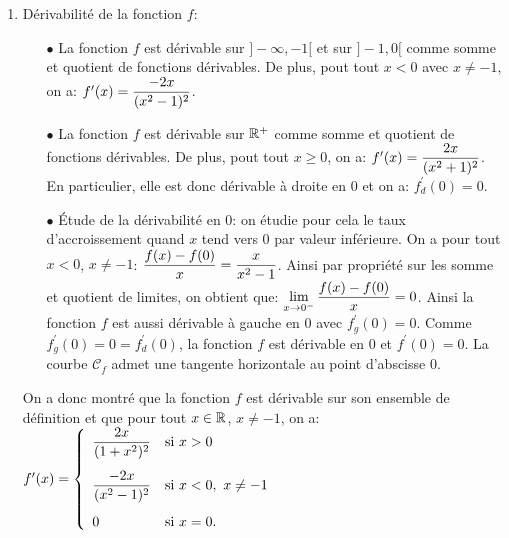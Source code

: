 \documentclass[a4paper, 11pt,reqno]{article}
\begin{document}
\begin{correction}
\begin{enumerate}
\begin{itemize}
			      \item[$\bullet$] La fonction $f$ est continue sur $\R^+$ comme somme et quotient de fonctions continues. En particulier, on a que: $f(0)=0=\lim\limits_{x\to 0^+} f(x)$.
			      \item[$\bullet$] \'Etude de la continuit\'e en 0: comme la fonction $f$ est d\'efinie par un raccord en 0, on doit \'etudier la continuit\'e de $f$ en 0 par les limites. On a d\'ej\`{a} que la fonction $f$ est continue \`{a} droite en 0 avec $f(0)=0=\lim\limits_{x\to 0^+} f(x)$. \'Etude de la limite \`{a} gauche en 0: on a: $\lim\limits_{x\to 0^-} f(x)=\lim\limits_{x\to 0^-} \ddp\frac{x^2}{x^2-1}=0$ par propri\'et\'es sur les somme et quotient de limites. Ainsi, on a: $f(0)=0=\lim\limits_{x\to 0^+} f(x)=\lim\limits_{x\to 0^-} f(x)$ et donc $f$ est continue en 0.
		      \end{itemize}
		      Ainsi la fonction $f$ est continue sur son ensemble de d\'efinition.
		\item D\'erivabilit\'e de la fonction $f$:
		      \begin{itemize}
			      \item[$\bullet$] La fonction $f$ est d\'erivable sur $\rbrack -\infty,-1\lbrack$ et sur $\rbrack -1,0\lbrack$ comme somme et quotient de fonctions d\'erivables. De plus, pout tout $x<0$ avec $x\not= -1$, on a: $f^{\prime}(x)=\displaystyle\frac{-2x}{(x^2-1)^2}$.
			      \item[$\bullet$] La fonction $f$ est d\'erivable sur $\R^+$ comme somme et quotient de fonctions d\'erivables. De plus, pout tout $x\geq 0$, on a: $f^{\prime}(x)=\displaystyle\frac{2x}{(x^2+1)^2}$. En particulier, elle est donc d\'erivable \`{a} droite en 0 et on a: $f_d^{\prime}(0)=0$.
			      \item[$\bullet$] \'Etude de la d\'erivabilit\'e en 0: on \'etudie pour cela le taux d'accroissement quand $x$ tend vers $0$ par valeur inf\'erieure. On a pour tout $x<0$, $x\not= -1$: $\displaystyle\frac{f(x)-f(0)}{x}=\displaystyle\frac{x}{x^2-1}$. Ainsi par propri\'et\'e sur les somme et quotient de limites, on obtient que: $\lim\limits_{x\to 0^-} \displaystyle\frac{f(x)-f(0)}{x}=0$. Ainsi la fonction $f$ est aussi d\'erivable \`{a} gauche en 0 avec $f_g^{\prime}(0)=0$. Comme $f_g^{\prime}(0)=0=f_d^{\prime}(0)$, la fonction $f$ est d\'erivable en 0 et $f^{\prime}(0)=0$. La courbe $\mathcal{C}_f$ admet une tangente horizontale au point d'abscisse 0.
		      \end{itemize}
		      On a donc montr\'e que la fonction $f$ est d\'erivable sur son ensemble de d\'efinition et que pour tout $x\in\mathbb{R}$, $x\not= -1$, on a: $f^{\prime}(x)=\left\lbrace\begin{array}{ll}   \ddp\frac{2x}{(1+x^2)^2} & \hbox{si}\ x>0\vsec\\ \ddp\frac{-2x}{(x^2-1)^2} & \hbox{si}\ x<0,\ x\not= -1\vsec\\ 0 & \hbox{si}\ x=0.     \end{array} \right.$

\end{enumerate}
\end{correction}
\end{document}
